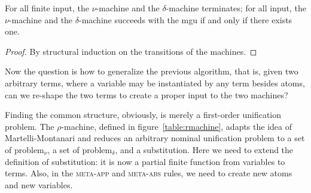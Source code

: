 \documentclass[a4paper,UKenglish]{lipics-v2016}
\newcommand*{\transname}[1]{\textsc{#1}}
\begin{document}
  \begin{lemma}\label{lemma:numachine}
 For all finite input, the $\nu$-machine and the $\delta$-machine terminates;
    for all input, the $\nu$-machine and the $\delta$-machine succeeds with the mgu
    if and only if there exists one.
    \end{lemma}
    \begin{proof}
     By structural induction on the transitions of the machines.
    \end{proof}

    Now the question is how to generalize the previous algorithm, that is,
    given two arbitrary terms, where a variable may be instantiated by any term besides atoms,
    can we re-shape the two terms to create a proper input to the two machines?

    Finding the common structure, obviously, is merely a first-order unification problem.
    The $\rho$-machine, defined in figure~\ref{table:rmachine}, adapts the idea of Martelli-Montanari
    and reduces an arbitrary nominal unification problem to a set of problem$_\nu$, a set of problem$_\delta$,
    and a substitution.
    Here we need to extend the definition of substitution:
    it is now a partial finite function from variables to terms.
    Also, in the \transname{meta-app} and \transname{meta-abs} rules,
    we need to create new atoms and new variables.
\end{document}

